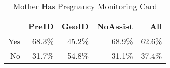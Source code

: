 \begin{table}[ht]
\centering
\begin{tabular}{rrrrr}
  \hline
 & PreID & GeoID & NoAssist & All \\ 
  \hline
Yes & 68.3\% & 45.2\% & 68.9\% & 62.6\% \\ 
  No & 31.7\% & 54.8\% & 31.1\% & 37.4\% \\ 
   \hline
\end{tabular}
\caption{Mother Has Pregnancy Monitoring Card} 
\end{table}
